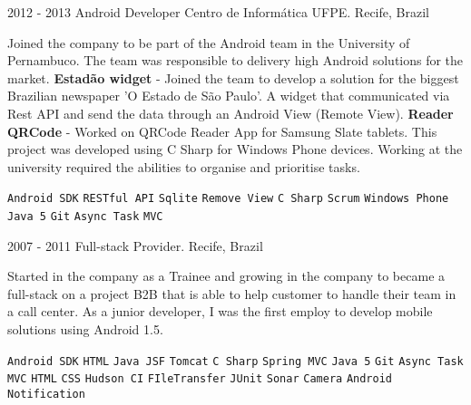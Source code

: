 \documentclass[9pt]{developercv} %
\begin{document}
\begin{entrylist}
	\entry
		{2012 -  2013}
		{Android Developer}
		{Centro de Informática UFPE. Recife, Brazil}
{

Joined the company to be part of the Android team in the University of Pernambuco. The team was responsible to delivery high Android solutions for the market.
\newline
\newline
\textbf{Estadão widget} - Joined the team to develop a solution for the biggest Brazilian newspaper ’O Estado de São Paulo’. A widget that communicated via Rest API and send the data through an Android View (Remote View). 
\newline
\newline
\textbf{Reader QRCode} - Worked on QRCode Reader App for Samsung Slate tablets. This project was developed using C Sharp for Windows Phone devices. Working at the university required the abilities to organise and prioritise tasks. 

 	{
 		\texttt{Android SDK}\slashsep
		 \texttt{RESTful API}\slashsep
		 \texttt{Sqlite}\slashsep
		 \texttt{Remove View}\slashsep
		 \texttt{C Sharp}\slashsep
		 \texttt{Scrum}\slashsep
		 \texttt{Windows Phone}\slashsep
		 \texttt{Java 5}\slashsep
		 \texttt{Git}\slashsep
		 \texttt{Async Task}\slashsep
		 \texttt{MVC}\slashsep
	}
}
\end{entrylist}
\begin{entrylist}
	\entry
		{2007 -  2011}
		{Full-stack}
		{Provider. Recife, Brazil}
{

Started in the company as a Trainee and growing in the company to became a full-stack on a project B2B that is able to help customer to handle their team in a call center. As a junior developer, I was the first employ to develop mobile solutions using Android 1.5.

 	{
 		\texttt{Android SDK}\slashsep
		 \texttt{HTML}\slashsep
		 \texttt{Java JSF}\slashsep
		 \texttt{Tomcat}\slashsep
		 \texttt{C Sharp}\slashsep
		 \texttt{Spring MVC}\slashsep
		 \texttt{Java 5}\slashsep
		 \texttt{Git}\slashsep
		 \texttt{Async Task}\slashsep
		 \texttt{MVC}\slashsep
		 \texttt{HTML}\slashsep
		 \texttt{CSS}\slashsep
		 \texttt{Hudson CI}\slashsep
		 \texttt{FIleTransfer}\slashsep
		 \texttt{JUnit}\slashsep
		 \texttt{Sonar}\slashsep
		 \texttt{Camera}\slashsep
		 \texttt{Android Notification}\slashsep
	}
}
\end{entrylist}
\end{document}
